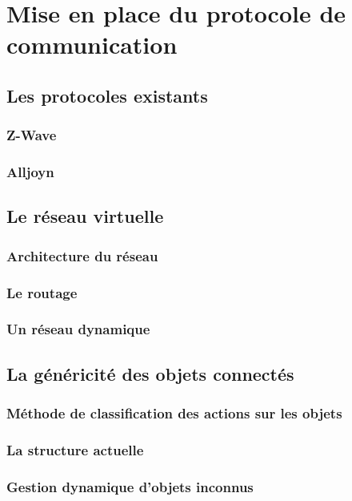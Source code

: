 \chapter{Mise en place du protocole de communication}

\section{Les protocoles existants}
	\subsection{Z-Wave}
	\subsection{Alljoyn}

\section{Le réseau virtuelle}
	\subsection{Architecture du réseau}
	\subsection{Le routage}
	\subsection{Un réseau dynamique}

\section{La généricité des objets connectés}
	\subsection{Méthode de classification des actions sur les objets}
	\subsection{La structure actuelle}
	\subsection{Gestion dynamique d’objets inconnus}

